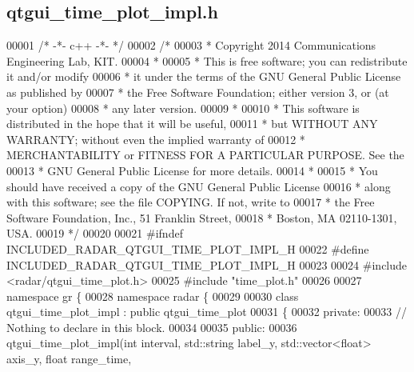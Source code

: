 \subsection{qtgui\+\_\+time\+\_\+plot\+\_\+impl.\+h}
\label{qtgui__time__plot__impl_8h_source}

\begin{DoxyCode}
00001 \textcolor{comment}{/* -*- c++ -*- */}
00002 \textcolor{comment}{/* }
00003 \textcolor{comment}{ * Copyright 2014 Communications Engineering Lab, KIT.}
00004 \textcolor{comment}{ * }
00005 \textcolor{comment}{ * This is free software; you can redistribute it and/or modify}
00006 \textcolor{comment}{ * it under the terms of the GNU General Public License as published by}
00007 \textcolor{comment}{ * the Free Software Foundation; either version 3, or (at your option)}
00008 \textcolor{comment}{ * any later version.}
00009 \textcolor{comment}{ * }
00010 \textcolor{comment}{ * This software is distributed in the hope that it will be useful,}
00011 \textcolor{comment}{ * but WITHOUT ANY WARRANTY; without even the implied warranty of}
00012 \textcolor{comment}{ * MERCHANTABILITY or FITNESS FOR A PARTICULAR PURPOSE.  See the}
00013 \textcolor{comment}{ * GNU General Public License for more details.}
00014 \textcolor{comment}{ * }
00015 \textcolor{comment}{ * You should have received a copy of the GNU General Public License}
00016 \textcolor{comment}{ * along with this software; see the file COPYING.  If not, write to}
00017 \textcolor{comment}{ * the Free Software Foundation, Inc., 51 Franklin Street,}
00018 \textcolor{comment}{ * Boston, MA 02110-1301, USA.}
00019 \textcolor{comment}{ */}
00020 
00021 \textcolor{preprocessor}{#ifndef INCLUDED\_RADAR\_QTGUI\_TIME\_PLOT\_IMPL\_H}
00022 \textcolor{preprocessor}{#define INCLUDED\_RADAR\_QTGUI\_TIME\_PLOT\_IMPL\_H}
00023 
00024 \textcolor{preprocessor}{#include <radar/qtgui_time_plot.h>}
00025 \textcolor{preprocessor}{#include "time_plot.h"}
00026 
00027 \textcolor{keyword}{namespace }gr \{
00028   \textcolor{keyword}{namespace }radar \{
00029 
00030     \textcolor{keyword}{class }qtgui_time_plot_impl : \textcolor{keyword}{public} qtgui_time_plot
00031     \{
00032      \textcolor{keyword}{private}:
00033       \textcolor{comment}{// Nothing to declare in this block.}
00034 
00035      \textcolor{keyword}{public}:
00036       qtgui_time_plot_impl(\textcolor{keywordtype}{int} interval, std::string label\_y, std::vector<float> axis\_y, \textcolor{keywordtype}{float} range\_time, 

\end{DoxyCode}
